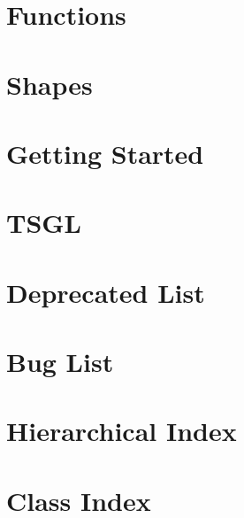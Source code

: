 \documentclass[twoside]{book}
\newcommand{\+}{\discretionary{\mbox{\scriptsize$\hookleftarrow$}}{}{}}
\begin{document}
\chapter{Functions}
\label{md__home_pretzel_workspace_tsgl__t_s_g_l_docs-src_tutorials_functions}
\hypertarget{md__home_pretzel_workspace_tsgl__t_s_g_l_docs-src_tutorials_functions}{}

\chapter{Shapes}
\label{md__home_pretzel_workspace_tsgl__t_s_g_l_docs-src_tutorials_shapes}
\hypertarget{md__home_pretzel_workspace_tsgl__t_s_g_l_docs-src_tutorials_shapes}{}

\chapter{Getting Started}
\label{md__home_pretzel_workspace_tsgl__t_s_g_l_docs-src_tutorials_started}
\hypertarget{md__home_pretzel_workspace_tsgl__t_s_g_l_docs-src_tutorials_started}{}

\chapter{T\+S\+G\+L}
\label{md__home_pretzel_workspace_tsgl__t_s_g_l_readme}
\hypertarget{md__home_pretzel_workspace_tsgl__t_s_g_l_readme}{}

\chapter{Deprecated List}
\label{deprecated}
\hypertarget{deprecated}{}

\chapter{Bug List}
\label{bug}
\hypertarget{bug}{}

\chapter{Hierarchical Index}

\chapter{Class Index}

\end{document}
